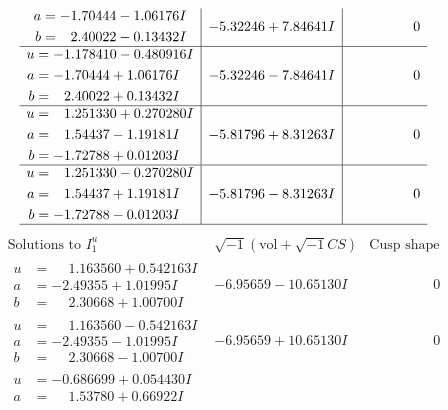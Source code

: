 \documentclass[1p]{elsarticle_modified}
\theoremstyle{definition}
\newcommand{\I}{\sqrt{-1}}
\begin{document}
$$\begin{array}{c|c|c}
\begin{aligned}
a &= -1.70444 - 1.06176 I \\
b &= \phantom{-}2.40022 - 0.13432 I\end{aligned}
 & -5.32246 + 7.84641 I & \phantom{-0.000000 } 0 \\ \hline\begin{aligned}
u &= -1.178410 - 0.480916 I \\
a &= -1.70444 + 1.06176 I \\
b &= \phantom{-}2.40022 + 0.13432 I\end{aligned}
 & -5.32246 - 7.84641 I & \phantom{-0.000000 } 0 \\ \hline\begin{aligned}
u &= \phantom{-}1.251330 + 0.270280 I \\
a &= \phantom{-}1.54437 - 1.19181 I \\
b &= -1.72788 + 0.01203 I\end{aligned}
 & -5.81796 + 8.31263 I & \phantom{-0.000000 } 0 \\ \hline\begin{aligned}
u &= \phantom{-}1.251330 - 0.270280 I \\
a &= \phantom{-}1.54437 + 1.19181 I \\
b &= -1.72788 - 0.01203 I\end{aligned}
 & -5.81796 - 8.31263 I & \phantom{-0.000000 } 0\\
 \hline 
 \end{array}$$\newpage$$\begin{array}{c|c|c}  
\text{Solutions to }I^u_{1}& \I (\text{vol} + \sqrt{-1}CS) & \text{Cusp shape}\\
 \hline 
\begin{aligned}
u &= \phantom{-}1.163560 + 0.542163 I \\
a &= -2.49355 + 1.01995 I \\
b &= \phantom{-}2.30668 + 1.00700 I\end{aligned}
 & -6.95659 - 10.65130 I & \phantom{-0.000000 } 0 \\ \hline\begin{aligned}
u &= \phantom{-}1.163560 - 0.542163 I \\
a &= -2.49355 - 1.01995 I \\
b &= \phantom{-}2.30668 - 1.00700 I\end{aligned}
 & -6.95659 + 10.65130 I & \phantom{-0.000000 } 0 \\ \hline\begin{aligned}
u &= -0.686699 + 0.054430 I \\
a &= \phantom{-}1.53780 + 0.66922 I \\

\end{aligned}
\end{array}$$
\end{document}
